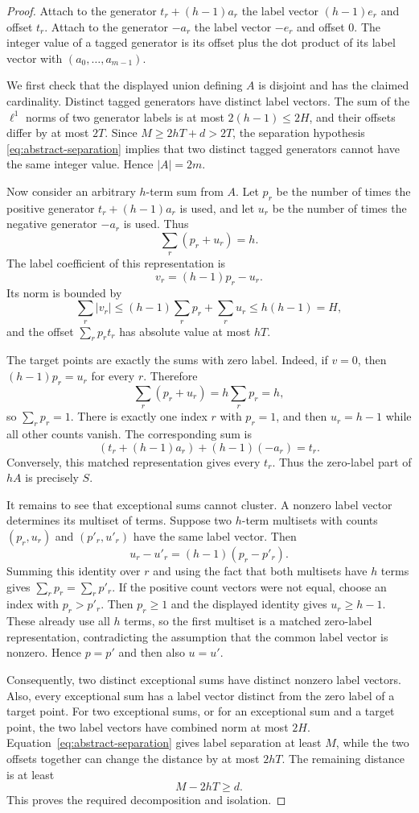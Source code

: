 \documentclass[11pt]{article}
\begin{document}
\begin{proof}
Attach to the generator $t_r+(h-1)a_r$ the label vector $(h-1)e_r$ and
offset $t_r$. Attach to the generator $-a_r$ the label vector $-e_r$ and
offset $0$. The integer value of a tagged generator is its offset plus the
dot product of its label vector with $(a_0,\ldots,a_{m-1})$.

We first check that the displayed union defining $A$ is disjoint and has the
claimed cardinality. Distinct tagged generators have distinct label vectors.
The sum of the $\ell^1$ norms of two generator labels is at most
$2(h-1)\leq 2H$, and their offsets differ by at most $2T$. Since
$M\geq 2hT+d>2T$, the separation hypothesis
\eqref{eq:abstract-separation} implies that two distinct tagged generators
cannot have the same integer value. Hence $|A|=2m$.

Now consider an arbitrary $h$-term sum from $A$. Let $p_r$ be the number of
times the positive generator $t_r+(h-1)a_r$ is used, and let $u_r$ be the
number of times the negative generator $-a_r$ is used. Thus
\[
 \sum_r(p_r+u_r)=h.
\]
The label coefficient of this representation is
\[
 v_r=(h-1)p_r-u_r.
\]
Its norm is bounded by
\[
 \sum_r |v_r|
 \leq (h-1)\sum_rp_r+\sum_ru_r
 \leq h(h-1)=H,
\]
and the offset $\sum_rp_rt_r$ has absolute value at most $hT$.

The target points are exactly the sums with zero label. Indeed, if $v=0$,
then $(h-1)p_r=u_r$ for every $r$. Therefore
\[
 \sum_r(p_r+u_r)=h\sum_rp_r=h,
\]
so $\sum_rp_r=1$. There is exactly one index $r$ with $p_r=1$, and then
$u_r=h-1$ while all other counts vanish. The corresponding sum is
\[
 (t_r+(h-1)a_r)+(h-1)(-a_r)=t_r.
\]
Conversely, this matched representation gives every $t_r$. Thus the
zero-label part of $hA$ is precisely $S$.

It remains to see that exceptional sums cannot cluster. A nonzero label
vector determines its multiset of terms. Suppose two $h$-term multisets with
counts $(p_r,u_r)$ and $(p'_r,u'_r)$ have the same label vector. Then
\[
 u_r-u'_r=(h-1)(p_r-p'_r).
\]
Summing this identity over $r$ and using the fact that both multisets have
$h$ terms gives $\sum_rp_r=\sum_rp'_r$. If the positive count vectors were
not equal, choose an index with $p_r>p'_r$. Then $p_r\geq 1$ and the
displayed identity gives $u_r\geq h-1$. These already use all $h$ terms, so
the first multiset is a matched zero-label representation, contradicting the
assumption that the common label vector is nonzero. Hence $p=p'$ and then
also $u=u'$.

Consequently, two distinct exceptional sums have distinct nonzero label
vectors. Also, every exceptional sum has a label vector distinct from the
zero label of a target point. For two exceptional sums, or for an exceptional
sum and a target point, the two label vectors have combined norm at most
$2H$. Equation~\eqref{eq:abstract-separation} gives label separation at
least $M$, while the two offsets together can change the distance by at most
$2hT$. The remaining distance is at least
\[
 M-2hT\geq d.
\]
This proves the required decomposition and isolation.
\end{proof}
\end{document}
